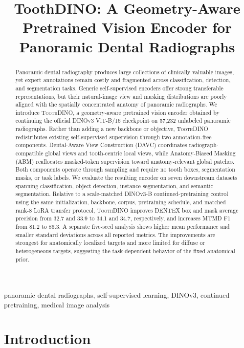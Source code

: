 \documentclass[conference]{IEEEtran}
\title{ToothDINO: A Geometry-Aware Pretrained Vision Encoder for Panoramic Dental Radiographs}
\author{\IEEEauthorblockN{Anonymous Authors}}
\author{
\IEEEauthorblockN{Author names omitted for anonymous review}
\IEEEauthorblockA{Affiliations omitted for anonymous review}
}
\newcommand{\ToothDINO}{\textsc{ToothDINO}}
\newcommand{\DAVC}{\textsc{DAVC}}
\newcommand{\ABM}{\textsc{ABM}}
\begin{document}
\maketitle

\begin{abstract}
Panoramic dental radiography produces large collections of clinically valuable images, yet expert annotations remain costly and fragmented across classification, detection, and segmentation tasks. Generic self-supervised encoders offer strong transferable representations, but their natural-image view and masking distributions are poorly aligned with the spatially concentrated anatomy of panoramic radiographs. We introduce \ToothDINO{}, a geometry-aware pretrained vision encoder obtained by continuing the official DINOv3 ViT-B/16 checkpoint on 57,232 unlabeled panoramic radiographs. Rather than adding a new backbone or objective, \ToothDINO{} redistributes existing self-supervised supervision through two annotation-free components. Dental-Aware View Construction (\DAVC{}) coordinates radiograph-compatible global views and tooth-centric local views, while Anatomy-Biased Masking (\ABM{}) reallocates masked-token supervision toward anatomy-relevant global patches. Both components operate through sampling and require no tooth boxes, segmentation masks, or task labels. We evaluate the resulting encoder on seven downstream datasets spanning classification, object detection, instance segmentation, and semantic segmentation. Relative to a scale-matched DINOv3-B continued-pretraining control using the same initialization, backbone, corpus, pretraining schedule, and matched rank-$8$ LoRA transfer protocol, \ToothDINO{} improves DENTEX box and mask average precision from 32.7 and 33.9 to 34.1 and 34.7, respectively, and increases MTMD F1 from 81.2 to 86.3. A separate five-seed analysis shows higher mean performance and smaller standard deviations across all reported metrics. The improvements are strongest for anatomically localized targets and more limited for diffuse or heterogeneous targets, suggesting the task-dependent behavior of the fixed anatomical prior.
\end{abstract}

\begin{IEEEkeywords}
panoramic dental radiographs, self-supervised learning, DINOv3, continued pretraining, medical image analysis
\end{IEEEkeywords}


\section{Introduction}
\label{sec:introduction}
\end{document}
